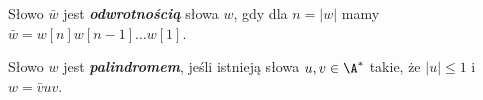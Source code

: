 \begin{definition}{}{}
  Słowo $\bar{w}$ jest \textbf{\textit{odwrotnością}} słowa $w$, gdy dla $n = |w|$ mamy $\bar{w} = w[n] w[n - 1] \ldots w[1]$.
\end{definition}

\begin{definition}{}{}
  Słowo $w$ jest \textbf{\textit{palindromem}}, jeśli istnieją słowa $u, v \in \A^*$ takie, że $|u| \le 1$ i $w = \bar{v} u v$.
\end{definition}
